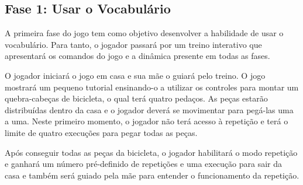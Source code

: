 
\subsection{Fase 1: Usar o Vocabulário} \label{ssec:fase_1}

A primeira fase do jogo tem como objetivo desenvolver a habilidade de usar o vocabulário. Para tanto, o jogador passará por um treino interativo que apresentará os comandos do jogo e a dinâmica presente em todas as fases.

O jogador iniciará o jogo em casa e sua mãe o guiará pelo treino. O jogo mostrará um pequeno tutorial ensinando-o a utilizar os controles para montar um quebra-cabeças de bicicleta, o qual terá quatro pedaços. As peças estarão distribuídas dentro da casa e o jogador deverá se movimentar para pegá-las uma a uma. Neste primeiro momento, o jogador não terá acesso à repetição e terá o limite de quatro execuções para pegar todas as peças.

Após conseguir todas as peças da bicicleta, o jogador habilitará o modo repetição e ganhará um número pré-definido de repetições e uma execução para sair da casa e também será guiado pela mãe para entender o funcionamento da repetição.
 
